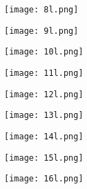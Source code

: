 \begin{figure}[h!]
	\centering
	\texttt{[image: 8l.png]}
	\label{fig:lat_acc_val}
\end{figure}


\begin{figure}[h!]
	\centering
	\texttt{[image: 9l.png]}
	\label{fig:lat_acc_val}
\end{figure}


\begin{figure}[h!]
	\centering
	\texttt{[image: 10l.png]}
	\label{fig:lat_acc_val}
\end{figure}


\begin{figure}[h!]
	\centering
	\texttt{[image: 11l.png]}
	\label{fig:lat_acc_val}
\end{figure}



\begin{figure}[h!]\label{fig:app_conv}
	\centering
	\texttt{[image: 12l.png]}
	
	\caption{}
\end{figure}


\begin{figure}[h!]\label{fig:app_grad}
	\centering
	\texttt{[image: 13l.png]}
	\caption{}
	
\end{figure}

\begin{figure}[h!]\label{fig:app_weights}
	\centering
	\texttt{[image: 14l.png]}
	\caption{}
	
\end{figure}


\begin{figure}[h!]\label{fig:app_update}
	\centering
	\texttt{[image: 15l.png]}
	\caption{}
	
\end{figure}


\begin{figure}[h!]\label{fig:app_multigrad}
	\centering
	\texttt{[image: 16l.png]}
	\caption{}

\end{figure}












